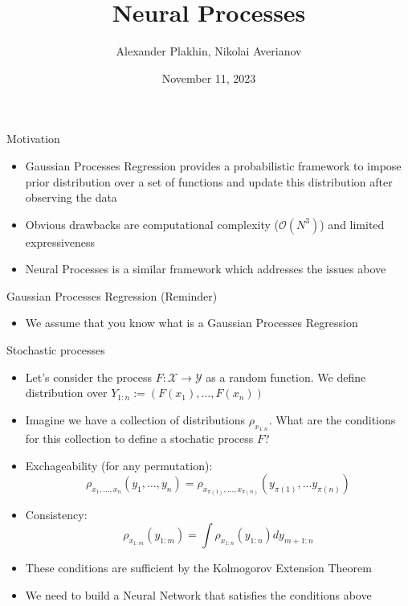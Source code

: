 \documentclass{beamer}%
\title{Neural Processes}
\author[Alexander Plakhin, Nikolai Averianov]{Alexander Plakhin, Nikolai Averianov}
\institute[HSE FES Probability Theory Club]{HSE FES Probability Theory Club}
\date{November 11, 2023}
\theoremstyle{definition}
\begin{document}
	
\begin{frame}
\titlepage
\end{frame}


\begin{frame}{Motivation}
\begin{itemize}
    \item Gaussian Processes Regression provides a probabilistic framework to impose prior distribution over a set of functions and update this distribution after observing the data
    \item Obvious drawbacks are computational complexity ($\mathcal{O}(N^3)$) and limited expressiveness
    \item Neural Processes is a similar framework which addresses the issues above
\end{itemize}
\end{frame}


\begin{frame}{Gaussian Processes Regression (Reminder)}
\begin{itemize}
    \item We assume that you know what is a Gaussian Processes Regression
\end{itemize}
\end{frame}


\begin{frame}{Stochastic processes}
\begin{itemize}
    \item Let's consider the process $F: \mathcal{X} \to \mathcal{Y}$ as a random function. We define distribution over $Y_{1:n} := (F(x_1), \ldots, F(x_n))$
    \item Imagine we have a collection of distributions $\rho_{x_{1:n}}$. What are the conditions for this collection to define a stochatic process $F$?
    \item Exchageability (for any permutation):
    $$\rho_{x_1,\ldots, x_n}(y_1, \ldots, y_n)
    = \rho_{x_{\pi(1)}, \ldots, x_{\pi(n)}}(y_{\pi(1)}, \ldots y_{\pi(n)})
    $$
    \item Consistency: 
    $$
    \rho_{x_{1:m}}(y_{1:m}) = 
    \int \rho_{x_{1:n}}(y_{1:n}) dy_{m+1:n}
    $$
    \item These conditions are sufficient by the Kolmogorov Extension Theorem
    \item We need to build a Neural Network that satisfies the conditions above
\end{itemize}
\end{frame}
\end{document}
